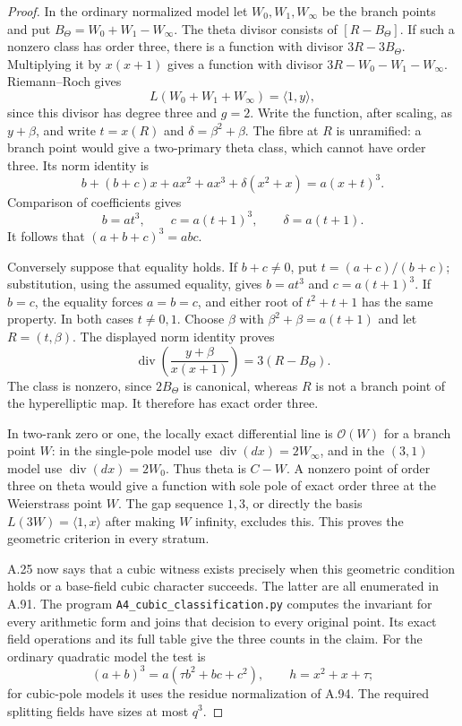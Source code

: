 \documentclass[11pt]{article}
\begin{document}
\begin{proof}
In the ordinary normalized model let $W_0,W_1,W_\infty$ be
the branch points and put $B_\Theta=W_0+W_1-W_\infty$.
The theta divisor consists of $[R-B_\Theta]$. If such a nonzero
class has order three, there is a function with divisor
$3R-3B_\Theta$. Multiplying it by $x(x+1)$ gives a function
with divisor $3R-W_0-W_1-W_\infty$. Riemann--Roch gives
\[
 L(W_0+W_1+W_\infty)=\langle1,y\rangle,
\]
since this divisor has degree three and $g=2$.
Write the function, after scaling, as $y+\beta$, and write
$t=x(R)$ and $\delta=\beta^2+\beta$. The fibre at $R$ is
unramified: a branch point would give a two-primary theta
class, which cannot have order three. Its norm identity is
\[
 b+(b+c)x+ax^2+ax^3+\delta(x^2+x)=a(x+t)^3.
\]
Comparison of coefficients gives
\[
 b=at^3,\qquad c=a(t+1)^3,\qquad \delta=a(t+1).
\]
It follows that $(a+b+c)^3=abc$.

Conversely suppose that equality holds. If $b+c\ne0$, put
$t=(a+c)/(b+c)$; substitution, using the assumed equality,
gives $b=at^3$ and $c=a(t+1)^3$. If $b=c$, the equality forces
$a=b=c$, and either root of $t^2+t+1$ has the same property.
In both cases $t\ne0,1$. Choose $\beta$ with
$\beta^2+\beta=a(t+1)$ and let $R=(t,\beta)$.
The displayed norm identity proves
\[
 \operatorname{div}\left(\frac{y+\beta}{x(x+1)}\right)
                      =3(R-B_\Theta).
\]
The class is nonzero, since $2B_\Theta$ is canonical, whereas
$R$ is not a branch point of the hyperelliptic map. It therefore
has exact order three.

In two-rank zero or one, the locally exact differential line is
$\mathcal O(W)$ for a branch point $W$: in the single-pole model
use $\operatorname{div}(dx)=2W_\infty$, and in the $(3,1)$
model use $\operatorname{div}(dx)=2W_0$.
Thus theta is $C-W$. A nonzero point of order three on theta
would give a function with sole pole of exact order three at
the Weierstrass point $W$. The gap sequence $1,3$, or directly
the basis $L(3W)=\langle1,x\rangle$ after making $W$ infinity,
excludes this. This proves the geometric criterion in every stratum.

A.25 now says that a cubic witness exists precisely when this
geometric condition holds or a base-field cubic character succeeds.
The latter are all enumerated in A.91. The program
\texttt{A4\_cubic\_classification.py} computes the invariant
for every arithmetic form and joins that decision to every
original point. Its exact field operations and its full table
give the three counts in the claim. For the ordinary quadratic
model the test is
\[
 (a+b)^3=a(\tau b^2+bc+c^2),\qquad h=x^2+x+\tau;
\]
for cubic-pole models it uses the residue normalization of A.94.
The required splitting fields have sizes at most $q^3$.


\end{proof}
\end{document}
